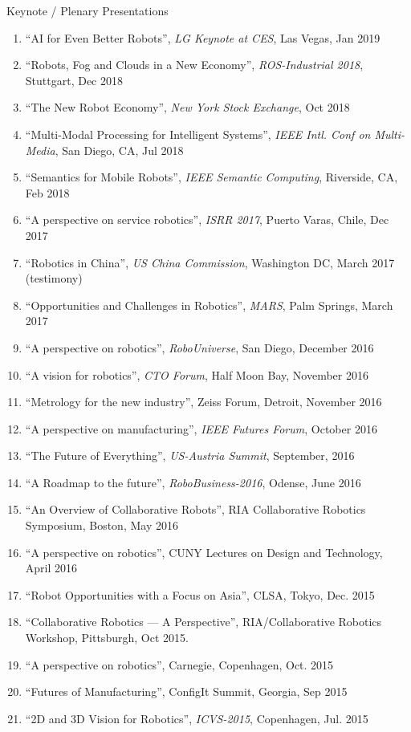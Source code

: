 \documentclass{article}
\begin{document}
\begin{cv}
\begin{cvlist}{Keynote / Plenary Presentations}
\begin{enumerate}
  \item ``AI for Even Better Robots'', {\em LG Keynote at CES}, Las Vegas, Jan 2019
  \item ``Robots, Fog and Clouds in a New Economy'', {\em ROS-Industrial 2018}, Stuttgart, Dec 2018
  \item ``The New Robot Economy'', {\em New York Stock Exchange}, Oct 2018
  \item ``Multi-Modal Processing for Intelligent Systems'', {\em IEEE Intl. Conf on Multi-Media},
          San Diego, CA, Jul 2018
  \item ``Semantics for Mobile Robots'', {\em IEEE Semantic Computing}, Riverside, CA, Feb 2018
  \item ``A perspective on service robotics'', {\em ISRR 2017}, Puerto Varas, Chile, Dec 2017
  \item ``Robotics in China'', {\em US China Commission}, Washington DC, March 2017 (testimony)
  \item ``Opportunities and Challenges in Robotics'', {\em MARS}, Palm Springs, March 2017
  \item ``A perspective on robotics'', {\em RoboUniverse}, San Diego,  December 2016
  \item ``A vision for robotics'', {\em CTO Forum}, Half Moon Bay, November 2016
  \item ``Metrology for the new industry'', Zeiss Forum, Detroit,  November 2016
  \item ``A perspective on manufacturing'', {\em IEEE Futures Forum},  October 2016
  \item ``The Future of Everything'', {\em US-Austria Summit},  September, 2016
  \item ``A Roadmap to the future'', {\em RoboBusiness-2016}, Odense,  June 2016
  \item ``An Overview of Collaborative Robots'', RIA Collaborative Robotics Symposium, Boston, May 2016
  \item ``A perspective on robotics'', CUNY Lectures on Design and Technology, April 2016
  \item ``Robot Opportunities with a Focus on Asia'', CLSA, Tokyo,  Dec. 2015
  \item ``Collaborative Robotics --- A Perspective'', RIA/Collaborative Robotics Workshop, Pittsburgh, Oct 2015.
  \item ``A perspective on robotics'', Carnegie, Copenhagen, Oct. 2015
  \item ``Futures of Manufacturing'', ConfigIt Summit, Georgia, Sep 2015
  \item ``2D and 3D Vision for Robotics'', {\em ICVS-2015}, Copenhagen, Jul. 2015

\end{enumerate}
\end{cvlist}
\end{cv}
\end{document}
